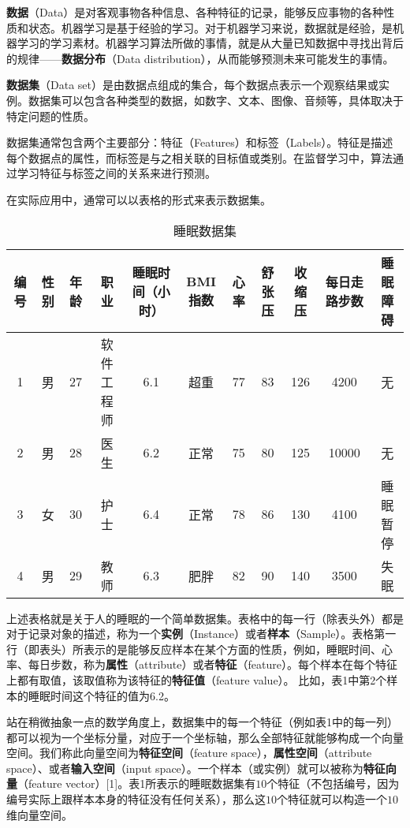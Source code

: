

\textbf{数据}（Data）是对客观事物各种信息、各种特征的记录，能够反应事物的各种性质和状态。机器学习是基于经验的学习。对于机器学习来说，数据就是经验，是机器学习的学习素材。机器学习算法所做的事情，就是从大量已知数据中寻找出背后的规律——\textbf{数据分布}（Data distribution），从而能够预测未来可能发生的事情。

\textbf{数据集}（Data set）是由数据点组成的集合，每个数据点表示一个观察结果或实例。数据集可以包含各种类型的数据，如数字、文本、图像、音频等，具体取决于特定问题的性质。

数据集通常包含两个主要部分：特征（Features）和标签（Labels）。特征是描述每个数据点的属性，而标签是与之相关联的目标值或类别。在监督学习中，算法通过学习特征与标签之间的关系来进行预测。

在实际应用中，通常可以以表格的形式来表示数据集。

\begin{table}[ht]
\centering
\caption{睡眠数据集}\label{tab_datast2}
\begin{tabular}{|c|c|c|c|c|c|c|c|c|c|c|}
\hline
编号 & 性别 & 年龄 & 职业 & 睡眠时间（小时） & BMI指数 & 心率 & 舒张压 & 收缩压 & 每日走路步数 & 睡眠障碍 \\\hline
1 & 男 & 27 & 软件工程师 & 6.1 & 超重 & 77 & 83 & 126 & 4200 & 无 \\
\hline
2 & 男 & 28 & 医生 & 6.2 & 正常 & 75 & 80 & 125 & 10000 & 无 \\
\hline
3 & 女 & 30 & 护士 & 6.4 & 正常 & 78 & 86 & 130 & 4100 & 睡眠暂停 \\
\hline
4 & 男 & 29 & 教师 & 6.3 & 肥胖 & 82 & 90 & 140 & 3500 & 失眠 \\
\hline
\end{tabular}
\end{table}

上述表格就是关于人的睡眠的一个简单数据集。表格中的每一行（除表头外）都是对于记录对象的描述，称为一个\textbf{实例}（Instance）或者\textbf{样本}（Sample）。表格第一行（即表头）所表示的是能够反应样本在某个方面的性质，例如，睡眠时间、心率、每日步数，称为\textbf{属性}（attribute）或者\textbf{特征}（feature）。每个样本在每个特征上都有取值，该取值称为该特征的\textbf{特征值}（feature value）。
比如，表1中第2个样本的睡眠时间这个特征的值为6.2。

站在稍微抽象一点的数学角度上，数据集中的每一个特征（例如表1中的每一列）都可以视为一个坐标分量，对应于一个坐标轴，那么全部特征就能够构成一个向量空间。我们称此向量空间为\textbf{特征空间}（feature space），\textbf{属性空间}（attribute space）、或者\textbf{输入空间}（input space）。一个样本（或实例）就可以被称为\textbf{特征向量}（feature vector）[1]。表1所表示的睡眠数据集有$10$个特征（不包括编号，因为编号实际上跟样本本身的特征没有任何关系），那么这$10$个特征就可以构造一个$10$维向量空间。

